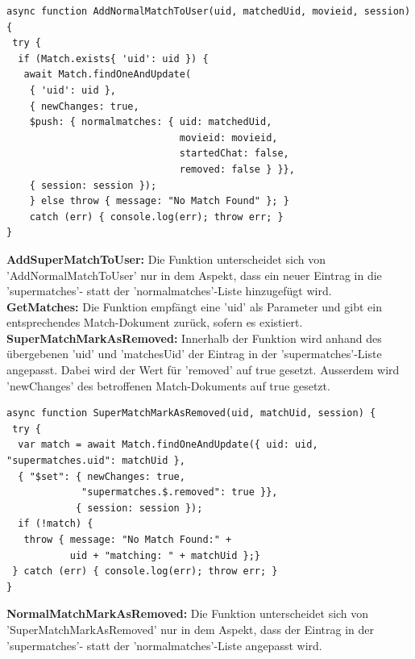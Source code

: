 \begin{lstlisting}[caption=Match Service - AddNormalMatchToUser, label=lst:matchserviceAddNormalMatchToUser]
async function AddNormalMatchToUser(uid, matchedUid, movieid, session) {
 try {
  if (Match.exists{ 'uid': uid }) {
   await Match.findOneAndUpdate(
    { 'uid': uid },
    { newChanges: true,
    $push: { normalmatches: { uid: matchedUid, 
                              movieid: movieid, 
                              startedChat: false, 
                              removed: false } }},
    { session: session });
    } else throw { message: "No Match Found" }; }
    catch (err) { console.log(err); throw err; }
}
\end{lstlisting}

\noindent
\textbf{AddSuperMatchToUser:}
Die Funktion unterscheidet sich von 'AddNormalMatchToUser' nur in dem Aspekt, dass ein neuer Eintrag in die 'supermatches'- statt der 'normalmatches'-Liste hinzugefügt wird.\\

\noindent
\textbf{GetMatches:}
Die Funktion empfängt eine 'uid' als Parameter und gibt ein entsprechendes Match-Dokument zurück, sofern es existiert.\\

\noindent
\textbf{SuperMatchMarkAsRemoved:}
Innerhalb der Funktion wird anhand des übergebenen 'uid' und 'matchesUid' der Eintrag in der 'supermatches'-Liste angepasst. Dabei wird der Wert für 'removed' auf true gesetzt. Ausserdem wird 'newChanges' des betroffenen Match-Dokuments auf true gesetzt.

\begin{lstlisting}[caption=Match Service - SuperMatchMarkAsRemoved, label=lst:matchserviceSuperMatchMarkAsRemoved]
async function SuperMatchMarkAsRemoved(uid, matchUid, session) {
 try {
  var match = await Match.findOneAndUpdate({ uid: uid, "supermatches.uid": matchUid },
  { "$set": { newChanges: true,
             "supermatches.$.removed": true }},
            { session: session });
  if (!match) {
   throw { message: "No Match Found:" + 
           uid + "matching: " + matchUid };}
 } catch (err) { console.log(err); throw err; }
}
\end{lstlisting}

\noindent
\textbf{NormalMatchMarkAsRemoved:}
Die Funktion unterscheidet sich von 'SuperMatchMarkAsRemoved' nur in dem Aspekt, dass der  Eintrag in der 'supermatches'- statt der 'normalmatches'-Liste angepasst wird.\\

